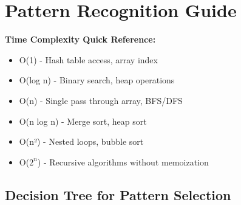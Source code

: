 \documentclass[10pt,a4paper]{article}
\begin{document}
\section{Pattern Recognition Guide}

\begin{complexitybox}
\textbf{Time Complexity Quick Reference:}
\begin{itemize}
\item O(1) - Hash table access, array index
\item O(log n) - Binary search, heap operations
\item O(n) - Single pass through array, BFS/DFS
\item O(n log n) - Merge sort, heap sort
\item O(n²) - Nested loops, bubble sort
\item O($2^n$) - Recursive algorithms without memoization
\end{itemize}
\end{complexitybox}

\subsection{Decision Tree for Pattern Selection}
\end{document}
